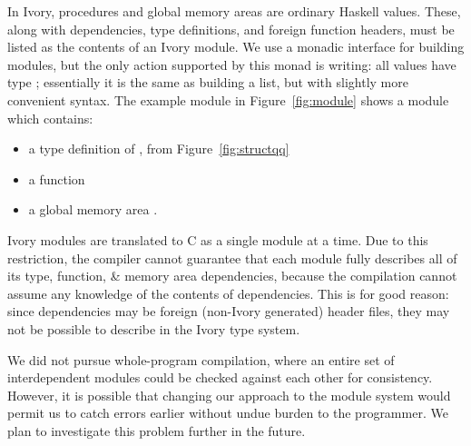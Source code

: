 In Ivory, procedures and global memory areas are ordinary Haskell values. These,
along with dependencies, type definitions, and foreign function headers, must be
listed as the contents of an Ivory module. We use a monadic interface for
building modules, but the only action supported by this  monad
is writing: all values have type ; essentially it is the same as
building a list, but with slightly more convenient syntax. The example module
in Figure~\ref{fig:module} shows a module  which contains:
\begin{itemize}
  \item a type definition of , from Figure~\ref{fig:structqq}
  \item a function 
  \item a global memory area .
\end{itemize}

Ivory modules are translated to C as a single module at a time. Due to this
restriction, the compiler cannot guarantee that each module fully describes all
of its type, function, \& memory area dependencies, because the compilation
cannot assume any knowledge of the contents of dependencies. This is for good
reason: since dependencies may be foreign (non-Ivory generated) header files,
they may not be possible to describe in the Ivory type system.

We did not pursue whole-program compilation, where an entire set of
interdependent modules could be checked against each other for consistency.
However, it is possible that changing our approach to the module system would
permit us to catch errors earlier without undue burden to the programmer. We
plan to investigate this problem further in the future.





